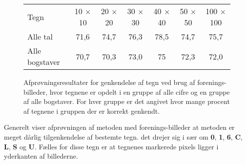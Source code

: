 \begin{figure}[htp]
\centering
\begin{tabular}{|l|c|c|c|c|c|c|}\hline
\rowcolor[gray]{0.9} \multicolumn{7}{|>{\columncolor[gray]{0.9}}c|}{\textbf{Forenings-billeder}} \\ \hline
Tegn & 10 $\times$ 10 & 20 $\times$ 20 & 30 $\times$ 30 & 40 $\times$ 40 & 50 $\times$ 50 & 100 $\times$ 100\\\hline
Alle tal & 71,6 & 74,7 & 76,3 & 78,5 & 74,7 & 75,7\\\hline
Alle bogstaver & 70,7 & 70,3 & 73,0 & 75 & 72,3 & 72,0\\\hline
\end{tabular}
\caption{Afprøvningsresultater for genkendelse af tegn ved brug af forenings-billeder, hvor tegnene er opdelt i en gruppe af alle cifre og en gruppe af alle bogstaver. For hver gruppe er det angivet hvor mange procent af tegnene i gruppen der er korrekt genkendt.}
\label{fig:test:and_alletegn}
\end{figure}

Generelt viser afprøvningen af metoden med forenings-billeder at metoden er meget dårlig tilgenkendelse af bestemte tegn. det drejer sig i sær om \textbf{0}, \textbf{1}, \textbf{6}, \textbf{C}, \textbf{L}, \textbf{S} og \textbf{U}. Fælles for disse tegn er at tegnenes markerede pixels ligger i yderkanten af billederne.


\begin{comment}

\begin{figure}[htp]
\centering
\begin{tabular}{|l|c|c|}\hline
\rowcolor[gray]{0.9} \multicolumn{3}{|>{\columncolor[gray]{0.9}}c|}{\textbf{Automatisk lokalisering}} \\ \hline
Sæt & Sammenhængende komponenter & Bjerg/dal \\\hline
Træningssæt & 0\% & 0\% \\\hline
Kontrolsæt & 0\% & 0\% \\\hline
\end{tabular}
\caption{Afprøvning af metoderne til separation af tegn på trænings- og kontrolsættet ved brug af automatisk lokalisering.}
\label{fig:test:sep-auto}
\end{figure}

\end{comment}

